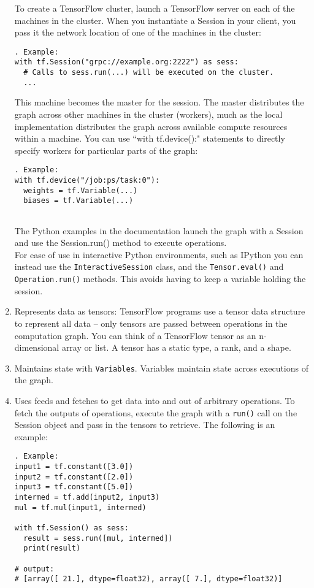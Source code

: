 \documentclass[11pt,a4paper]{article}
\begin{document}
\begin{enumerate}
	To create a TensorFlow cluster, launch a TensorFlow server on each of the machines in the cluster. When you instantiate a Session in your client, you pass it the network location of one of the machines in the cluster:
	\begin{lstlisting}. Example: 
with tf.Session("grpc://example.org:2222") as sess:
  # Calls to sess.run(...) will be executed on the cluster.
  ...
	\end{lstlisting}
	This machine becomes the master for the session. The master distributes the graph across other machines in the cluster (workers), much as the local implementation distributes the graph across available compute resources within a machine.
	You can use ``with tf.device():" statements to directly specify workers for particular parts of the graph:
	\begin{lstlisting}. Example: 
with tf.device("/job:ps/task:0"):
  weights = tf.Variable(...)
  biases = tf.Variable(...)
  
  	\end{lstlisting}
The Python examples in the documentation launch the graph with a Session and use the Session.run() method to execute operations.\\
For ease of use in interactive Python environments, such as IPython you can instead use the \texttt{InteractiveSession} class, and the \texttt{Tensor.eval()} and \texttt{Operation.run()} methods. This avoids having to keep a variable holding the session.
	
	\item Represents data as tensors: TensorFlow programs use a tensor data structure to represent all data -- only tensors are passed between operations in the computation graph. You can think of a TensorFlow tensor as an n-dimensional array or list. A tensor has a static type, a rank, and a shape. 
	\item Maintains state with \texttt{Variables}. Variables maintain state across executions of the graph. 
	
	\item Uses feeds and fetches to get data into and out of arbitrary operations. To fetch the outputs of operations, execute the graph with a \texttt{run()} call on the Session object and pass in the tensors to retrieve. The following is an example: 
\begin{lstlisting}. Example: 
input1 = tf.constant([3.0])
input2 = tf.constant([2.0])
input3 = tf.constant([5.0])
intermed = tf.add(input2, input3)
mul = tf.mul(input1, intermed)

with tf.Session() as sess:
  result = sess.run([mul, intermed])
  print(result)

# output:
# [array([ 21.], dtype=float32), array([ 7.], dtype=float32)]
\end{lstlisting}
\end{enumerate}
\end{document}
